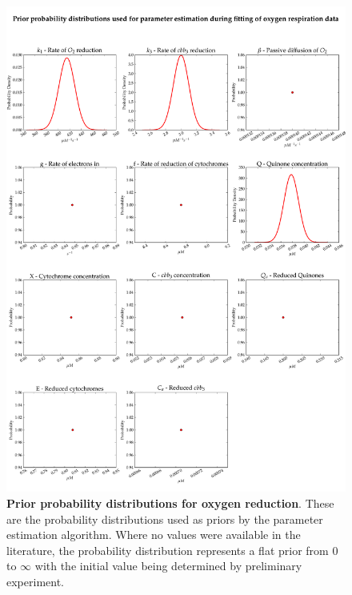 \begin{figure}[tbp]
 \centering
 \includegraphics[width=15cm, trim=0cm 0cm 0cm 0cm]{./05-oxygenreduction/data/priors.pdf}
 \caption[Prior probability distributions for oxygen reduction]{{\bf Prior probability distributions for oxygen reduction}. These are the probability distributions used as priors by the parameter estimation algorithm. Where no values were available in the literature, the probability distribution represents a flat prior from 0 to $\infty$ with the initial value being determined by preliminary experiment.
 \label{fig:oxypriors}}
\end{figure}

